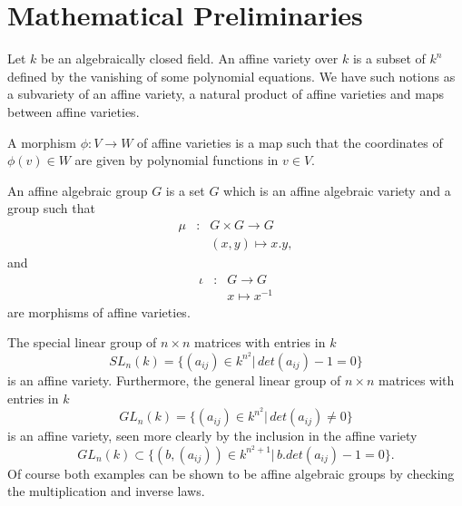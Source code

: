 
\chapter{Mathematical Preliminaries}
\label{Chapter2}

Let $k$ be an algebraically closed field. An affine variety over $k$ is a subset of $k^n$ defined by the vanishing of some polynomial equations. We have such notions as a subvariety of an affine variety, a natural product of affine varieties and maps between affine varieties.

A morphism $\phi:V \rightarrow W$ of affine varieties is a map such that the coordinates of $\phi(v) \in W$ are given by polynomial functions in $v \in V$.

An affine algebraic group $G$ is a set $G$ which is an affine algebraic variety and a group such that
\begin{eqnarray*}
	\mu&:& G \times G \rightarrow G\\
	&&(x,y) \mapsto x.y,
\end{eqnarray*}
and
\begin{eqnarray*}
	\iota&:& G \rightarrow G \\
	&&x \mapsto x^{-1}
\end{eqnarray*}
are morphisms of affine varieties.

\begin{example}
	The special linear group of $n\times n$ matrices with entries in $k$
	\begin{displaymath}
		SL_n(k) = \{(a_{ij}) \in k^{n^2} |\, det(a_{ij}) - 1 = 0\}
	\end{displaymath}
	is an affine variety. Furthermore, the general linear group of $n\times n$ matrices with entries in $k$
	\begin{displaymath}
		GL_n(k) = \{(a_{ij}) \in k^{n^2} |\, det(a_{ij}) \neq 0\}
	\end{displaymath}
	is an affine variety, seen more clearly by the inclusion in the affine variety
	\begin{displaymath}
		GL_n(k)\subset \{(b, (a_{ij})) \in k^{n^2 + 1} |\, b.det(a_{ij}) - 1 = 0\}.
	\end{displaymath}
	Of course both examples can be shown to be affine algebraic groups by checking the multiplication and inverse laws.
\end{example}

